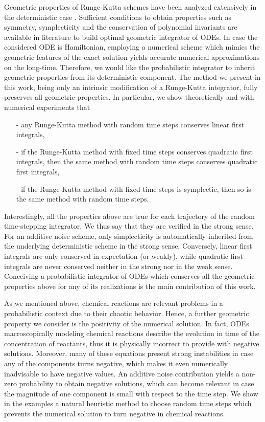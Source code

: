 \documentclass{siamart1116}
\numberwithin{theorem}{section}
\begin{document}
Geometric properties of Runge-Kutta schemes have been analyzed extensively in the deterministic case \cite{HLW06}. Sufficient conditions to obtain properties such as symmetry, symplecticity and the conservation of polynomial invariants are available in literature to build optimal geometric integrator of ODEs. In case the considered ODE is Hamiltonian, employing a numerical scheme which mimics the geometric features of the exact solution yields accurate numerical approximations on the long-time. Therefore, we would like the probabilistic integrator to inherit geometric properties from its deterministic component. The method we present in this work, being only an intrinsic modification of a Runge-Kutta integrator, fully preserves all geometric properties. In particular, we show theoretically and with numerical experiments that
\begin{itemize}
	\item[-] any Runge-Kutta method with random time steps conserves linear first integrals,
	\item[-] if the Runge-Kutta method with fixed time steps conserves quadratic first integrals, then the same method with random time steps conserves quadratic first integrals,
	\item[-] if the Runge-Kutta method with fixed time steps is symplectic, then so is the same method with random time steps.
\end{itemize}
Interestingly, all the properties above are true for each trajectory of the random time-stepping integrator. We thus say that they are verified in the strong sense. For an additive noise scheme, only simplecticity is automatically inherited from the underlying deterministic scheme in the strong sense. Conversely, linear first integrals are only conserved in expectation (or weakly), while quadratic first integrals are never conserved neither in the strong nor in the weak sense. Conceiving a probabilistic integrator of ODEs which conserves all the geometric properties above for any of its realizations is the main contribution of this work.

As we mentioned above, chemical reactions are relevant problems in a probabilistic context due to their chaotic behavior. Hence, a further geometric property we consider is the positivity of the numerical solution. In fact, ODEs macroscopically modeling chemical reactions describe the evolution in time of the concentration of reactants, thus it is physically incorrect to provide with negative solutions. Moreover, many of these equations present strong instabilities in case any of the components turns negative, which makes it even numerically inadvisable to have negative values. An additive noise contribution yields a non-zero probability to obtain negative solutions, which can become relevant in case the magnitude of one component is small with respect to the time step. We show in the examples a natural heuristic method to choose random time steps which prevents the numerical solution to turn negative in chemical reactions.
\end{document}
